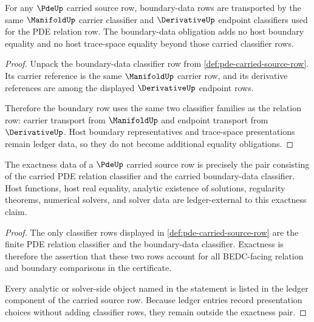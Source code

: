 \begin{theorem}\label{thm:pde-boundary-data-obligation}
For any $\PdeUp$ carried source row, boundary-data rows are transported by the same $\ManifoldUp$ carrier classifier and $\DerivativeUp$ endpoint classifiers used for the PDE relation row. The boundary-data obligation adds no host boundary equality and no host trace-space equality beyond those carried classifier rows.
\end{theorem}
\begin{proof}
Unpack the boundary-data classifier row from \autoref{def:pde-carried-source-row}. Its carrier reference is the same $\ManifoldUp$ carrier row, and its derivative references are among the displayed $\DerivativeUp$ endpoint rows.

Therefore the boundary row uses the same two classifier families as the relation row: carrier transport from $\ManifoldUp$ and endpoint transport from $\DerivativeUp$. Host boundary representatives and trace-space presentations remain ledger data, so they do not become additional equality obligations.
\end{proof}

\begin{theorem}\label{thm:pde-ledger-exactness-obligation}
The exactness data of a $\PdeUp$ carried source row is precisely the pair consisting of the carried PDE relation classifier and the carried boundary-data classifier. Host functions, host real equality, analytic existence of solutions, regularity theorems, numerical solvers, and solver data are ledger-external to this exactness claim.
\end{theorem}
\begin{proof}
The only classifier rows displayed in \autoref{def:pde-carried-source-row} are the finite PDE relation classifier and the boundary-data classifier. Exactness is therefore the assertion that these two rows account for all BEDC-facing relation and boundary comparisons in the certificate.

Every analytic or solver-side object named in the statement is listed in the ledger component of the carried source row. Because ledger entries record presentation choices without adding classifier rows, they remain outside the exactness pair.
\end{proof}

